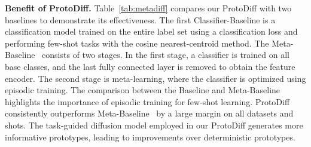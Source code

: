 




\textbf{Benefit of ProtoDiff.}
Table~\ref{tab:metadiff} compares our ProtoDiff with two baselines to demonstrate its effectiveness. The first Classifier-Baseline is a classification model trained on the entire label set using a classification loss and performing few-shot tasks with the cosine nearest-centroid method. The Meta-Baseline~\cite{chen2021meta} consists of two stages. In the first stage, a classifier is trained on all base classes, and the last fully connected layer is removed to obtain the feature encoder. The second stage is meta-learning, where the classifier is optimized using episodic training. The comparison between the Baseline and Meta-Baseline highlights the importance of episodic training for few-shot learning. ProtoDiff consistently outperforms Meta-Baseline~\cite{chen2021meta} by a large margin on all datasets and shots. The task-guided diffusion model employed in our ProtoDiff generates more informative prototypes, leading to improvements over deterministic prototypes.


